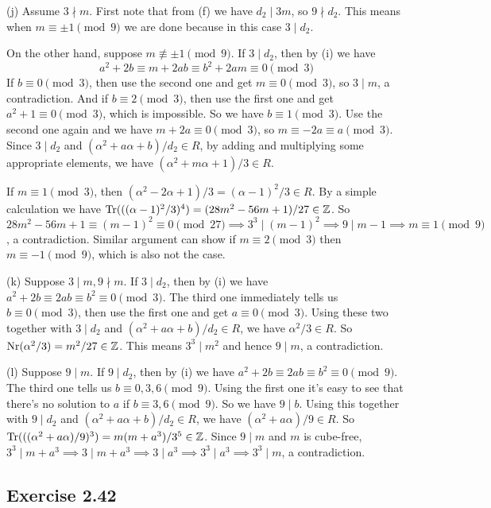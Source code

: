 \documentclass[../Marcus.tex]{subfiles}
\begin{document}
(j) Assume $3\nmid m$. First note that from (f) we have $d_2\mid 3m$, so $9\nmid d_2$. This means when $m\equiv \pm1 \pmod{9}$ we are done because in this case $3\mid d_2$.

On the other hand, suppose $m\not\equiv \pm1 \pmod{9}$. If $3\mid d_2$, then by (i) we have $$a^2+2b\equiv m+2ab\equiv b^2+2am \equiv 0 \pmod{3}$$ If $b\equiv 0\pmod{3}$, then use the second one and get $m\equiv 0\pmod{3}$, so $3\mid m$, a contradiction. And if $b\equiv 2\pmod{3}$, then use the first one and get $a^2+1\equiv 0\pmod{3}$, which is impossible. So we have $b\equiv 1\pmod{3}$. Use the second one again and we have $m+2a\equiv 0\pmod{3}$, so $m\equiv -2a\equiv a \pmod{3}$. Since $3\mid d_2$ and $(\alpha^2+a\alpha+b)/d_2\in R$, by adding and multiplying some appropriate elements, we have $(\alpha^2+m\alpha+1)/3\in R$.

If $m\equiv 1\pmod{3}$, then $(\alpha^2-2\alpha+1)/3=(\alpha-1)^2/3\in R$. By a simple calculation we have $\operatorname{Tr}(((\alpha-1)^2/3)^4) = (28m^2-56m+1)/27\in\mathbb{Z}$. So $28m^2-56m+1\equiv (m-1)^2 \equiv 0\pmod{27}\implies 3^3\mid (m-1)^2\implies 9\mid m-1\implies m\equiv 1\pmod{9}$, a contradiction. Similar argument can show if $m\equiv 2\pmod{3}$ then $m\equiv -1\pmod{9}$, which is also not the case.

(k) Suppose $3\mid m,9\nmid m$. If $3\mid d_2$, then by (i) we have $a^2+2b\equiv 2ab\equiv b^2 \equiv 0 \pmod{3}$. The third one immediately tells us $b\equiv 0\pmod{3}$, then use the first one and get $a\equiv 0\pmod{3}$. Using these two together with $3\mid d_2$ and $(\alpha^2+a\alpha+b)/d_2\in R$, we have $\alpha^2/3\in R$. So $\operatorname{Nr}(\alpha^2/3)=m^2/27\in\mathbb{Z}$. This means $3^3\mid m^2$ and hence $9\mid m$, a contradiction.

(l) Suppose $9\mid m$. If $9\mid d_2$, then by (i) we have $a^2+2b\equiv 2ab\equiv b^2 \equiv 0 \pmod{9}$. The third one tells us $b\equiv 0,3,6\pmod{9}$. Using the first one it's easy to see that there's no solution to $a$ if $b\equiv 3,6\pmod{9}$. So we have $9\mid b$. Using this together with $9\mid d_2$ and $(\alpha^2+a\alpha+b)/d_2\in R$, we have $(\alpha^2+a\alpha)/9\in R$. So $\operatorname{Tr}(((\alpha^2+a\alpha)/9)^3)=m(m+a^3)/3^5\in\mathbb{Z}$. Since $9\mid m$ and $m$ is cube-free, $3^3\mid m+a^3 \implies 3\mid m+a^3 \implies 3\mid a^3 \implies 3^3\mid a^3 \implies 3^3\mid m$, a contradiction.

\subsection*{Exercise 2.42}
\end{document}
